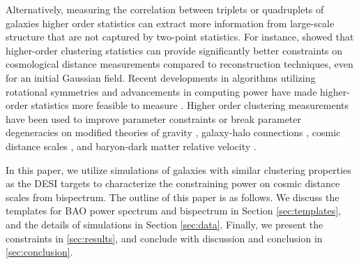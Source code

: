 Alternatively, measuring the correlation between triplets or quadruplets of galaxies higher order statistics can extract more information from large-scale structure that are not captured by two-point statistics. For instance, \cite{samushia2021information} showed that higher-order clustering statistics can provide significantly better constraints on cosmological distance measurements compared to reconstruction techniques, even for an initial Gaussian field. Recent developments in algorithms utilizing rotational symmetries and advancements in computing power have made higher-order statistics more feasible to measure \citep[see, e.g.,][]{Szapudi_2004,2015MNRAS.454.4142S,2016MNRAS.455L..31S, 2017MNRAS.468.1070S, 2017MNRAS.469.2059S, 2018MNRAS.478.1468S, 2022PNAS..11911366P}. Higher order clustering measurements have been used to improve parameter constraints or break parameter degeneracies on modified theories of gravity \citep{2023arXiv230206808S}, galaxy-halo connections \citep{2022MNRAS.515.6133Z}, cosmic distance scales \citep{2017MNRAS.469.1738S, 2018MNRAS.478.4500P}, and baryon-dark matter relative velocity \citep{2018MNRAS.474.2109S}.

In this paper, we utilize simulations of galaxies with similar clustering properties as the DESI targets to characterize the constraining power on cosmic distance scales from bispectrum. The outline of this paper is as follows. We discuss the templates for BAO power spectrum and bispectrum in Section \ref{sec:templates}, and the details of simulations in Section \ref{sec:data}. Finally, we present the constraints in \ref{sec:results}, and conclude with discussion and conclusion in \ref{sec:conclusion}.